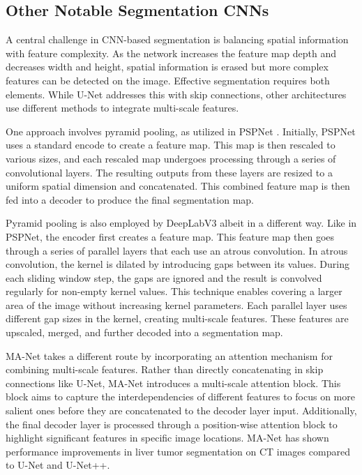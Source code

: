 \subsection{Other Notable Segmentation CNNs}

A central challenge in CNN-based segmentation is balancing spatial information with feature complexity. As the network increases the feature map depth and decreases width and height, spatial information is erased but more complex features can be detected on the image. Effective segmentation requires both elements. While U-Net addresses this with skip connections, other architectures use different methods to integrate multi-scale features.

One approach involves pyramid pooling, as utilized in PSPNet \cite{zhao2017pspnet}. Initially, PSPNet uses a standard encode to create a feature map. This map is then rescaled to various sizes, and each rescaled map undergoes processing through a series of convolutional layers. The resulting outputs from these layers are resized to a uniform spatial dimension and concatenated. This combined feature map is then fed into a decoder to produce the final segmentation map.

Pyramid pooling is also employed by DeepLabV3 \cite{chen2017rethinking} albeit in a different way. Like in PSPNet, the encoder first creates a feature map. This feature map then goes through a series of parallel layers that each use an atrous convolution. In atrous convolution, the kernel is dilated by introducing gaps between its values. During each sliding window step, the gaps are ignored and the result is convolved regularly for non-empty kernel values. This technique enables covering a larger area of the image without increasing kernel parameters. Each parallel layer uses different gap sizes in the kernel, creating multi-scale features. These features are upscaled, merged, and further decoded into a segmentation map.

MA-Net \cite{manet} takes a different route by incorporating an attention mechanism for combining multi-scale features. Rather than directly concatenating in skip connections like U-Net, MA-Net introduces a multi-scale attention block. This block aims to capture the interdependencies of different features to focus on more salient ones before they are concatenated to the decoder layer input. Additionally, the final decoder layer is processed through a position-wise attention block to highlight significant features in specific image locations. MA-Net has shown performance improvements in liver tumor segmentation on CT images compared to U-Net and U-Net++.

